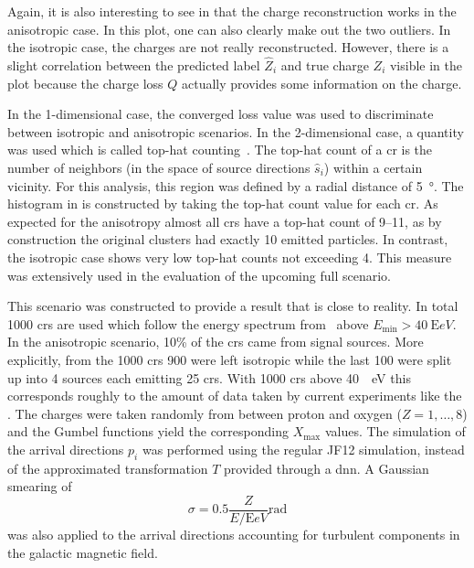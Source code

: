 Again, it is also interesting to see in  that the charge reconstruction works in the anisotropic case. In this plot, one can also clearly make out the two outliers. In the isotropic case, the charges are not really reconstructed. However, there is a slight correlation between the predicted label \(\hat Z_i\) and true charge \(Z_i\) visible in the plot because the charge loss \(Q\) actually provides some information on the charge.

In the 1-dimensional case, the converged loss value was used to discriminate between isotropic and anisotropic scenarios. In the 2-dimensional case, a quantity was used which is called top-hat counting~\cite{esf35}. The top-hat count of a \gls{cr} is the number of neighbors (in the space of source directions \(\hat s_i\)) within a certain vicinity. For this analysis, this region was defined by a radial distance of \SI{5}{\degree}. The histogram in  is constructed by taking the top-hat count value for each \gls{cr}. As expected for the anisotropy almost all \glspl{cr} have a top-hat count of 9--11, as by construction the original clusters had exactly 10 emitted particles. In contrast, the isotropic case shows very low top-hat counts not exceeding 4. This measure was extensively used in the evaluation of the upcoming full scenario.


This scenario was constructed to provide a result that is close to reality. In total 1000 \glspl{cr} are used which follow the energy spectrum from~\cite{esf4} above \(E_{\min} > \SI{40}{\exa eV}\). In the anisotropic scenario, 10\% of the \glspl{cr} came from signal sources. More explicitly, from the 1000 \glspl{cr} 900 were left isotropic while the last 100 were split up into 4 sources each emitting 25 \glspl{cr}. With 1000 \glspl{cr} above \SI{40}{\exa{}eV} this corresponds roughly to the amount of data taken by current experiments like the \pao{}. The charges were taken randomly from between proton and oxygen (\(Z=1, \ldots, 8\)) and the Gumbel functions yield the corresponding \(X_{\max}\) values. The simulation of the arrival directions \(p_i\) was performed using the regular JF12 simulation, instead of the approximated transformation \(T\) provided through a \gls{dnn}.
A Gaussian smearing of
\begin{equation}\label{eq:magnet-spread}
    \sigma = 0.5 \frac{Z}{E/\si{\exa eV}} \si{\radian}
\end{equation}
was also applied to the arrival directions accounting for turbulent components in the galactic magnetic field.

